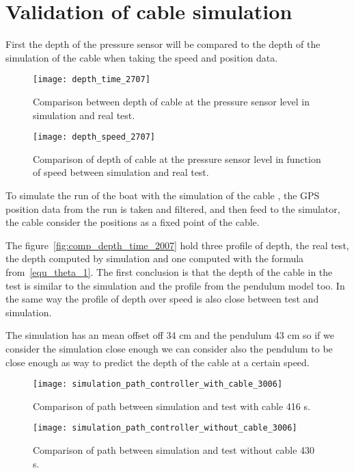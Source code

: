 \section{Validation of cable simulation}

First the depth of the pressure sensor will be compared to the depth of the simulation of the cable when taking the speed and position data.

\begin{figure}[H]
\centering
    \begin{minipage}[b]{0.4\textwidth}
    \centering
    \texttt{[image: depth\_time\_2707]}
    \caption{Comparison between depth of cable at the pressure sensor level in simulation and real test.}
    \label{fig:comp_depth_time_2007}
    \end{minipage}
    \hfill
    \begin{minipage}[b]{0.45\textwidth}
    \centering
    \texttt{[image: depth\_speed\_2707]}
    \caption{Comparison of depth of cable at the pressure sensor level in function of speed between simulation and real test.}
    \label{fig:comp_depth_speed_2007}
    \end{minipage}
\end{figure}

To simulate the run of the boat with the simulation of the cable , the \gls{GPS} position data from the run is taken and filtered, and then feed to the simulator, the cable consider the positions as a fixed point of the cable.

The figure~\ref{fig:comp_depth_time_2007} hold three profile of depth, the real test, the depth computed by simulation and one computed with the formula from~\ref{equ_theta_1}. The first conclusion is that the depth of the cable in the test is similar to the simulation and the profile from the pendulum model too.
 In the same way the profile of depth over speed is also close between test and simulation.
 
 The simulation has an mean offset off 34 cm and the pendulum  43 cm so if we consider the simulation close enough we can consider also the pendulum to be close enough as way to predict the depth of the cable at a certain speed.
 
 \begin{figure}[H]
\centering
    \begin{minipage}[b]{0.4\textwidth}
    \centering
    \texttt{[image: simulation\_path\_controller\_with\_cable\_3006]}
    \caption{Comparison of path between simulation and test with cable 416 s.}
    \label{fig:comp_w_cable_3006}
    \end{minipage}
    \hfill
    \begin{minipage}[b]{0.45\textwidth}
    \centering
    \texttt{[image: simulation\_path\_controller\_without\_cable\_3006]}
    \caption{Comparison of path between simulation and test without cable 430 s.}
    \label{fig:comp_wt_cable_3006}
    \end{minipage}
\end{figure}

